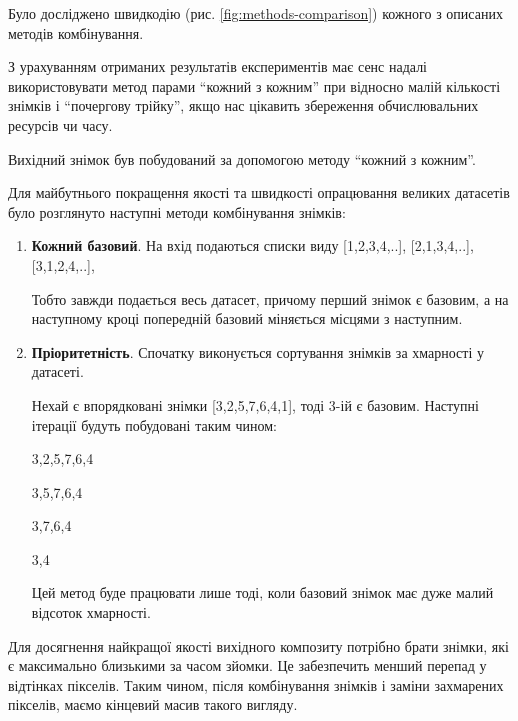 Було досліджено швидкодію (рис. \ref{fig:methods-comparison}) кожного з описаних методів комбінування.

З урахуванням отриманих результатів експериментів має сенс надалі використовувати
метод парами ``кожний з кожним'' при відносно малій кількості знімків і ``почергову трійку'',
якщо нас цікавить збереження обчислювальних ресурсів чи часу.

Вихідний знімок був побудований за допомогою методу ``кожний з кожним''.

Для майбутнього покращення якості та швидкості опрацювання великих датасетів
було розглянуто наступні методи комбінування знімків:

\begin{enumerate}
	\item \textbf{Кожний базовий}. На вхід подаються списки виду [1,2,3,4,..], [2,1,3,4,..],
		[3,1,2,4,..],

		Тобто завжди подається весь датасет, причому перший знімок є базовим, а на наступному
		кроці попередній базовий міняється місцями з наступним.

	\item \textbf{Пріоритетність}. Спочатку виконується сортування знімків за
		хмарності у датасеті.

		Нехай є впорядковані знімки [3,2,5,7,6,4,1], тоді 3-ій є базовим. Наступні
		ітерації будуть побудовані таким чином:

		3,2,5,7,6,4

		3,5,7,6,4

		3,7,6,4

		3,4

		Цей метод буде працювати лише тоді, коли базовий знімок має дуже малий відсоток
		хмарності.
\end{enumerate}

Для досягнення найкращої якості вихідного композиту потрібно брати знімки, які є
максимально близькими за часом зйомки. Це забезпечить менший перепад у відтінках
пікселів. Таким чином, після комбінування знімків і заміни захмарених пікселів, маємо
кінцевий масив такого вигляду.

